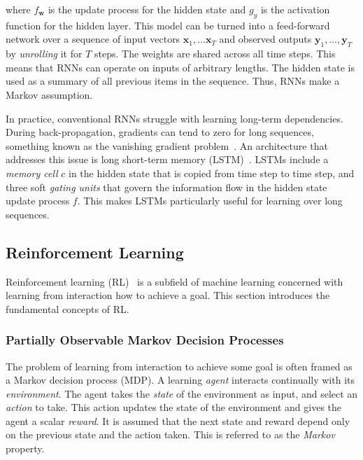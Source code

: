 where \(f_\mathbf{w}\) is the update process for the hidden state and \(g_y\) is the activation function for the hidden layer.
This model can be turned into a feed-forward network over a sequence of input vectors \(\mathbf{x}_1, \dots \mathbf{x}_T\) and observed outputs \(\mathbf{y}_1, \dots, \mathbf{y}_T\) by \textit{unrolling} it for \(T\) steps. The weights are shared across all time steps. This means that RNNs can operate on inputs of arbitrary lengths.
The hidden state is used as a summary of all previous items in the sequence.
Thus, RNNs make a Markov assumption.~\cite{russell_artificial_2021}

In practice, conventional RNNs struggle with learning long-term dependencies.
During back-propagation, gradients can tend to zero for long sequences, something known as the vanishing gradient problem~\cite{goodfellow_deep_2016}.
An architecture that addresses this issue is long short-term memory (LSTM)~\cite{hochreiter_schmidhuber_lstm_1997}.
LSTMs include a \textit{memory cell} \(c\) in the hidden state that is copied from time step to time step, and three soft \textit{gating units} that govern the information flow in the hidden state update process \(f\). This makes LSTMs particularly useful for learning over long sequences.

\subsection{Reinforcement Learning}
\label{sec:reinforcementlearning}

Reinforcement learning (RL)~\cite{sutton_reinforcement_2018} is a subfield of machine learning concerned with learning from interaction how to achieve a goal.
This section introduces the fundamental concepts of RL.

\subsubsection{Partially Observable Markov Decision Processes}
\label{sec:pomdp}

The problem of learning from interaction to achieve some goal is often framed as a Markov decision process (MDP).
A learning \textit{agent} interacts continually with its \textit{environment}.
The agent takes the \textit{state} of the environment as input, and select an \textit{action} to take.
This action updates the state of the environment and gives the agent a scalar \textit{reward}.
It is assumed that the next state and reward depend only on the previous state and the action taken.
This is referred to as the \textit{Markov} property.~\cite{kaelbling_pomdp_1998}

